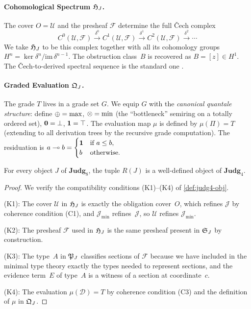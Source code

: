 \begin{construction}
\paragraph{Cohomological Spectrum $\mathfrak{H}_J$.}
The cover $O = \mathcal{U}$ and the presheaf $\mathcal{F}$ determine
the full \v{C}ech complex
\[
  C^0(\mathcal{U}, \mathcal{F}) \xrightarrow{\delta^0}
  C^1(\mathcal{U}, \mathcal{F}) \xrightarrow{\delta^1}
  C^2(\mathcal{U}, \mathcal{F}) \xrightarrow{\delta^2} \cdots
\]
We take $\mathfrak{H}_J$ to be this complex together with all its
cohomology groups $H^n = \ker \delta^n / \mathrm{im}\, \delta^{n-1}$.
The obstruction class~$B$ is recovered as $B = [z] \in H^1$.
The \v{C}ech-to-derived spectral sequence is the standard one
\cite{weibel1994}.

\paragraph{Graded Evaluation $\mathfrak{Q}_J$.}
The grade $T$ lives in a grade set $G$.  We equip $G$ with the
\emph{canonical quantale structure}: define $\oplus = \max$,
$\otimes = \min$ (the ``bottleneck'' semiring on a totally ordered set),
$\mathbf{0} = \bot$, $\mathbf{1} = \top$.  The evaluation map $\mu$ is defined
by $\mu(\Pi) = T$ (extending to all derivation trees by the
recursive grade computation).
The residuation is $a \multimap b = \begin{cases} \mathbf{1} & \text{if }
a \leq b, \\ b & \text{otherwise.}\end{cases}$
\end{construction}

\begin{proposition}
\label{prop:R-objects}
For every object $J$ of $\mathbf{Judg}_8$, the tuple $R(J)$ is a
well-defined object of $\mathbf{Judg}_4$.
\end{proposition}

\begin{proof}
We verify the compatibility conditions (K1)--(K4) of
\cref{def:judg4-obj}.

(K1): The cover $\mathcal{U}$ in $\mathfrak{H}_J$ is exactly the obligation
cover~$O$, which refines $\mathcal{J}$ by coherence condition (C1),
and $\mathcal{J}_{\mathrm{min}}$ refines~$\mathcal{J}$, so $\mathcal{U}$
refines $\mathcal{J}_{\mathrm{min}}$.

(K2): The presheaf $\mathcal{F}$ used in $\mathfrak{H}_J$ is the same
presheaf present in $\mathfrak{S}_J$ by construction.

(K3): The type~$A$ in $\mathfrak{P}_J$ classifies sections of $\mathcal{F}$
because we have included in the minimal type theory exactly the types
needed to represent sections, and the evidence term~$E$ of type~$A$ is
a witness of a section at coordinate~$c$.

(K4): The evaluation $\mu(\mathcal{D}) = T$ by coherence condition (C3)
and the definition of $\mu$ in $\mathfrak{Q}_J$.
\end{proof}

